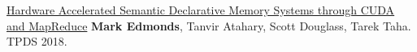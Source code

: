 


\begin{cvpublications}

\item \cvpublication
{\href{http://www.mjedmonds.com/projects/DM/TPDS18_HADM_final.pdf}{Hardware Accelerated Semantic Declarative Memory Systems through CUDA and MapReduce}} %
{\textbf{Mark Edmonds}, Tanvir Atahary, Scott Douglass, Tarek Taha.} %
{TPDS 2018.} %
{} %

\end{cvpublications}